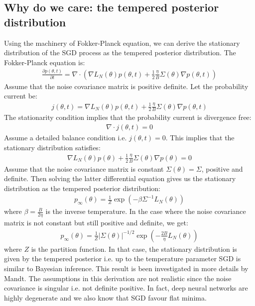 \documentclass[11pt]{article}
\begin{document}
\subsection{Why do we care: the tempered posterior distribution}
Using the machinery of Fokker-Planck equation, we can derive the stationary distribution of the SGD process as the tempered posterior distribution. The Fokker-Planck equation is:
\begin{align}
\frac{\partial p(\theta, t)}{\partial t} = \nabla \cdot \left( 
    \nabla L_N(\theta) p(\theta, t) + \frac{1}{2} \frac{\eta}{B} \Sigma(\theta) \nabla p(\theta, t) \right)
\end{align}
Assume that the noise covariance matrix is positive definite. Let the probability current be:
\begin{align}
j(\theta, t) = \nabla L_N(\theta) p(\theta, t) + \frac{1}{2} \frac{\eta}{B} \Sigma(\theta) \nabla p(\theta, t)
\end{align}
The stationarity condition implies that the probability current is divergence free:
\begin{align}
\nabla \cdot j(\theta, t) = 0
\end{align}
Assume a detailed balance condition i.e. $j(\theta, t) = 0$. This implies that the stationary distribution satisfies:
\begin{align}
\nabla L_N(\theta) p(\theta) + \frac{1}{2} \frac{\eta}{B} \Sigma(\theta) \nabla p(\theta) = 0
\end{align}
Assume that the noise covariance matrix is constant $\Sigma(\theta) = \Sigma$, positive and definite. Then solving the latter differential equation gives us the stationary distribution as the tempered posterior distribution:
\begin{align}
p_{\infty}(\theta) = \frac{1}{Z} \exp\left(-\beta \Sigma^{-1} L_{N}(\theta)\right)
\end{align}
where $\beta = \frac{B}{2\eta}$ is the inverse temperature.
In the case where the noise covariance matrix is not constant but still positive and definite, we get:
\begin{align}
p_{\infty}(\theta) = \frac{1}{Z}|\Sigma(\theta)|^{-1/2}\exp\left(-\frac{2B}{\eta} L_{N}(\theta)\right)
\end{align}
where $Z$ is the partition function. In that case, the stationary distribution is given by the tempered posterior i.e. up to the temperature parameter SGD is similar to Bayesian inference. This result is been investigated in more details by Mandt. The assumptions in this derivation are not realistic since the noise covariance is singular i.e. not definite positive. In fact, deep neural networks are highly degenerate and we also know that SGD favour flat minima. 
\end{document}
